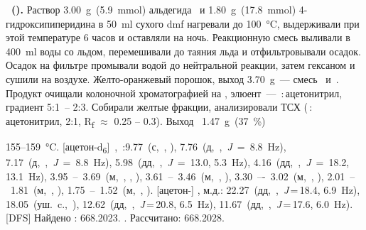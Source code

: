 \textbf{~().}
Раствор \SI{3.00}{\gram}~(\SI{5.9}{\mmol}) альдегида~ и \SI{1.80}{\gram}~(\SI{17.8}{\mmol}) 4-гидроксипиперидина в \SI{50}{\milli\litre} сухого \ac{dmf} нагревали до \SI{100}{\celsius}, выдерживали при этой температуре 6 часов и оставляли на ночь.
Реакционную смесь выливали в \SI{400}{\milli\litre} воды со льдом, перемешивали до таяния льда и отфильтровывали осадок.
Осадок на фильтре промывали водой до нейтральной реакции, затем гексаном и сушили на воздухе.
Желто-оранжевый порошок, выход \SI{3.70}{\gram}~--- смесь~ и~.
Продукт очищали колоночной хроматографией на , элюент~--- \,:\,ацетонитрил, градиент 5:1~-- 2:3. Собирали желтые фракции, анализировали ТСХ (\,:\,ацетонитрил, 2:1, R\textsubscript{f} $\approx$ 0.25 -- 0.3).
Выход~ \SI{1.47}{\gram}~(\SI{37}{\percent})
\begin{experimental}[]
     155--\SI{159}{\celsius}.
    [ацетон-d\textsubscript{6}]~\chemdelta{},~\si{\ppm}:9.77~(с,~, ), 7.76~(д,~,~\textit{J}~=~8.8~\si{\hertz}), 7.17~(д,~,~\textit{J}~=~8.8~\si{\hertz}), 5.98~(дд,~,~\textit{J}~=~13.0, 5.3~\si{\hertz}), 4.16~(дд,~,~\textit{J}~=~18.2, 13.1~\si{\hertz}), 3.95~--~3.69~(м,~, , ), 3.61~--~3.46~(м,~, ), 3.30~–-~3.02~(м,~, ), 2.01~--~1.81~(м,~, ), 1.75~--~1.52~(м,~, ).
    [ацетон-] \chemdelta, м.д.: 22.27~(дд,~,~\textit{J}\,=\,18.4, 6.9~\si{\hertz}), 18.05~(уш.~c.,~), 12.62~(дд,~,~\textit{J}\,=\,20.8, 6.5~\si{\hertz}), 11.67~(дд,~,~\textit{J}\,=\,17.6, 6.0~\si{\hertz}).
    [DFS] Найдено \ce{[M+]}: \num{668.2023}. . Рассчитано:  \num{668.2028}.
\end{experimental}

